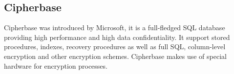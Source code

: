 \subsection{Cipherbase}
Cipherbase was introduced by Microsoft,
it is a full-fledged SQL database providing high performance and high data confidentiality.
It support stored procedures, indexes, recovery procedures as well as full SQL,
column-level encryption and other encryption schemes.
Cipherbase makes use of special hardware for encryption processes.